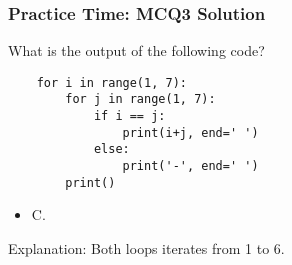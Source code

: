 \documentclass{beamer}
\begin{document}
\begin{frame}[fragile]
    \frametitle{Practice Time: MCQ3 Solution}
    What is the output of the following code?

    \begin{verbatim}
    for i in range(1, 7):
        for j in range(1, 7):
            if i == j:
                print(i+j, end=' ')
            else:
                print('-', end=' ')
        print()
    \end{verbatim}
    \begin{itemize}
        \item \alert{C.}
              \alert{
                  }
    \end{itemize}
    Explanation: Both loops iterates from 1 to 6.
\end{frame}
\end{document}
